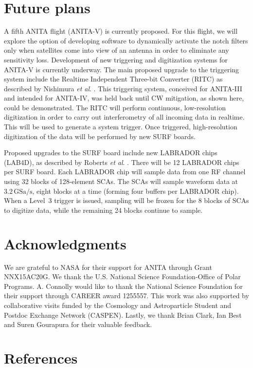 \documentclass[preprint,12pt]{elsarticle}
\begin{document}
\section{Future plans}

A fifth ANITA flight (ANITA-V) is currently proposed. For this flight, we will
explore the option of developing software to dynamically activate 
the notch filters only when satellites come into view of an antenna in order to
eliminate any sensitivity loss.
Development of new triggering and digitization systems for ANITA-V is currently underway.
The main proposed upgrade to the triggering system include the Realtime Independent Three-bit Converter (RITC) 
as described by Nishimura \textit{et al}. \cite{ritc}. 
This triggering system, conceived for ANITA-III and intended for ANITA-IV, was held back until CW mitigation, as shown here, could be demonstrated. 
The RITC will perform continuous, low-resolution digitization in order to carry out interferometry of all incoming data in realtime. 
This will be used to generate a system trigger. 
Once triggered, high-resolution digitization of the data will be performed by new SURF boards. 

Proposed upgrades to the SURF board include
new LABRADOR chips (LAB4D), as described by Roberts \textit{et al}. \cite{lab4d}.
There will be 12 LABRADOR chips per SURF board. 
Each LABRADOR chip will sample data from one RF channel using 32 blocks of 128-element SCAs. 
The SCAs will sample waveform data at $3.2\,\mbox{GSa/s}$, eight blocks at a time (forming four buffers per LABRADOR chip).
When a Level~3 trigger is issued, sampling will be frozen for the 8 blocks of SCAs to digitize data, while the remaining 24 blocks continue to sample.

\section{Acknowledgments}

We are grateful to NASA for their support for ANITA through 
Grant NNX15AC20G. We thank the U.S. National 
Science 
Foundation-Office of
Polar Programs. A. Connolly would like to thank the National Science 
Foundation for their support through CAREER
award 1255557. This work was also supported by 
collaborative visits 
funded by the Cosmology and Astroparticle Student and 
Postdoc Exchange Network (CASPEN).
Lastly, we thank Brian Clark, Ian Best
and Suren Gourapura for their valuable feedback.

\section{References}

 

\end{document}
